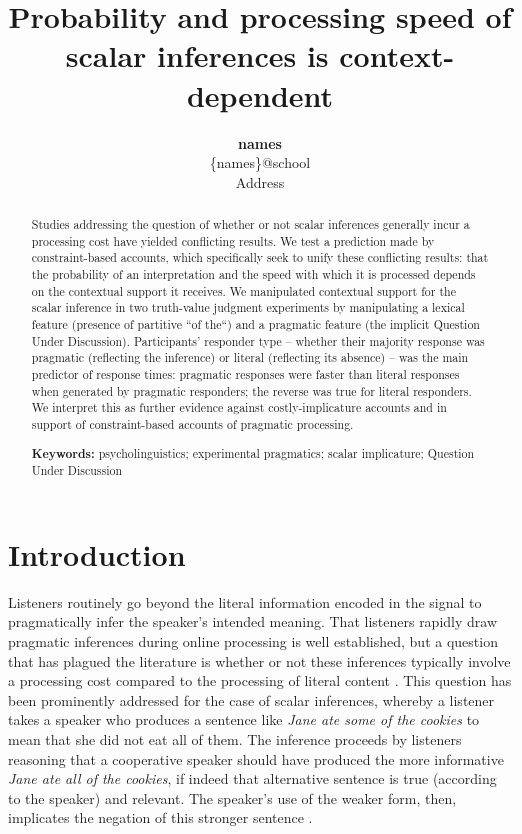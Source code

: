 \documentclass[10pt,letterpaper]{article}
\title{Probability and processing speed of scalar inferences is context-dependent}
\author{{\large \textbf{names}}  \\
 \{names\}@school\\
  Address}
\begin{document}
\maketitle


\begin{abstract}

Studies addressing the question of whether or not scalar inferences generally incur a processing cost  have yielded conflicting results. We test a prediction made by constraint-based accounts, which specifically seek to unify these conflicting results: that the probability of an interpretation and the speed with which it is processed depends on the contextual support it receives. We manipulated contextual support for the scalar inference in two truth-value judgment experiments  by manipulating a lexical feature (presence of partitive ``of the``) and a pragmatic feature (the implicit Question Under Discussion). Participants' responder type -- whether their majority response was pragmatic (reflecting the inference) or literal (reflecting its absence) -- was the main predictor of response times: pragmatic responses  were faster than literal responses when generated by pragmatic responders; the reverse was true for literal responders. We interpret this as further evidence against costly-implicature accounts and in support of constraint-based accounts of pragmatic processing.

\textbf{Keywords:} psycholinguistics; experimental pragmatics; scalar implicature; Question Under Discussion

\end{abstract}

\section{Introduction}

Listeners routinely go beyond the literal information encoded in the signal to pragmatically infer the speaker's intended meaning. That listeners rapidly draw pragmatic inferences during online processing is well established, but a question that has plagued the literature is whether or not these inferences typically involve a processing cost compared to the processing of literal content \cite{BottNoveck2004,BrehenyEtAl2006,HuangSnedeker2009,HuangSnedeker2011,Grodner2010,Breheny2013,DegenTanenhaus2016,DeNeysSchaeken2007,TomlinsonEtAl2012}. This question has been prominently addressed for the case of scalar inferences, whereby a listener takes a speaker who produces a sentence like \textit{Jane ate some of the cookies} to mean that she did not eat all of them. The inference proceeds by listeners reasoning that a cooperative speaker should have produced the more informative \emph{Jane ate all of the cookies}, if indeed that alternative sentence is true (according to the speaker) and relevant. The speaker's use of the weaker form, then, implicates the negation of this stronger sentence \cite{Grice1975}.
\end{document}
